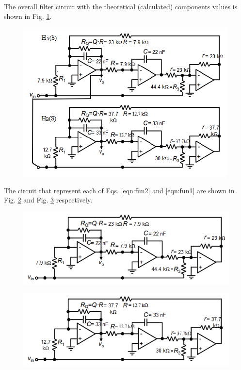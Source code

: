 \documentclass[hidelinks]{article}
\begin{document}
	\pagebreak
	\noindent The overall filter circuit with the theoretical (calculated) components values is shown in Fig. \ref{f:overallCirTheo}.
	\begin{figure}[htbp]
		\centering
		\includegraphics[width=0.6\textheight]{overallfun.png}
		\label{f:overallCirTheo}
	\end{figure}

	\pagebreak	
	\noindent The circuit that represent each of Eqs. \ref{eqn:fun2} and \ref{eqn:fun1} are shown in Fig. \ref{f:afun} and Fig. \ref{f:bfun} respectively.
	\begin{figure}[htbp]
		\centering
		\includegraphics[width=0.6\textheight]{afun.png}
		\label{f:afun}
	\end{figure}
	\begin{figure}[htbp]
		\centering
		\includegraphics[width=0.6\textheight]{bfun.png}
		\label{f:bfun}
	\end{figure}
	
\end{document}
